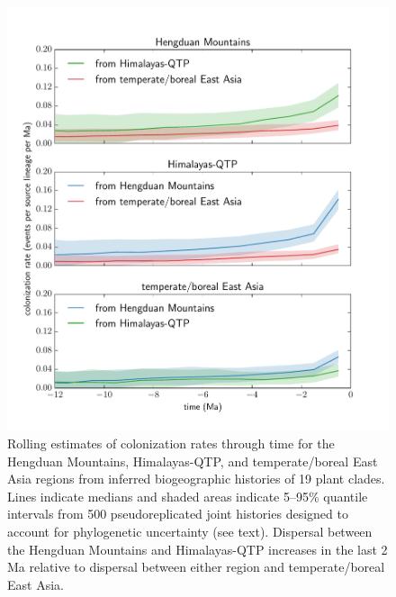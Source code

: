 \documentclass[9pt,twocolumn,twoside,lineno]{pnas-new}
\begin{document}
\begin{figure}
\centering
\includegraphics[width=.99\linewidth]{figures/figure_dispersal_rates/figure_dispersal_rates.pdf}
\caption{Rolling estimates of colonization rates through time for the
  Hengduan Mountains, Himalayas-QTP, and temperate/boreal East Asia
  regions from inferred biogeographic histories of 19 plant
  clades. Lines indicate medians and shaded areas indicate 5–95\%
  quantile intervals from 500 pseudoreplicated joint histories
  designed to account for phylogenetic uncertainty (see
  text). Dispersal between the Hengduan Mountains and Himalayas-QTP
  increases in the last 2 Ma relative to dispersal between either
  region and temperate/boreal East Asia.}
\label{fig:dispersal}
\end{figure}
\end{document}
